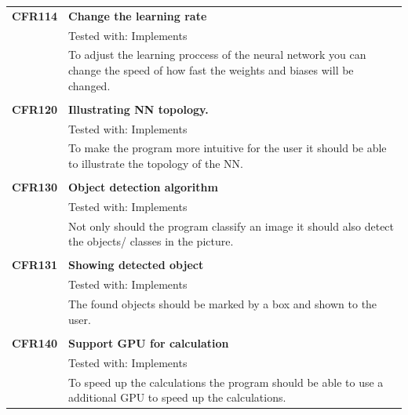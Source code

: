 \documentclass[parskip=full]{scrartcl}
\begin{document}
\begin{tabular}{p{2cm}p{12cm}}
\textbf {CFR114} & \textbf{Change the learning rate} \\
& Tested with: Implements\\
& To adjust the learning proccess of the neural network you can change the speed of how fast the weights and biases will be changed.\\
& \\
\textbf {CFR120} & \textbf{Illustrating NN topology.} \\
& Tested with: Implements\\
& To make the program more intuitive for the user it should be able to illustrate the topology of the NN.\\
& \\
\textbf {CFR130} & \textbf{Object detection algorithm} \\
& Tested with: Implements\\
& Not only should the program classify an image it should also detect the objects/ classes in the picture. \\
& \\
\textbf {CFR131} & \textbf{Showing detected object} \\
& Tested with: Implements\\
& The found objects should be marked by a box and shown to the user. \\
& \\
\textbf {CFR140} & \textbf{Support GPU for calculation} \\
& Tested with: Implements\\
& To speed up the calculations the program should be able to use a additional GPU to speed up the calculations.\\
\end{tabular}
\end{document}
